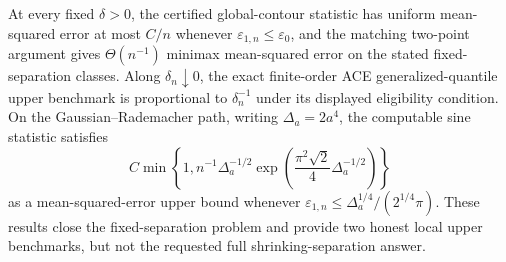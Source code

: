 At every fixed \(\delta>0\), the certified global-contour statistic has uniform mean-squared error at most \(C/n\) whenever \(\varepsilon_{1,n}\le\varepsilon_0\), and the matching two-point argument gives \(\Theta(n^{-1})\) minimax mean-squared error on the stated fixed-separation classes. Along \(\delta_n\downarrow0\), the exact finite-order ACE generalized-quantile upper benchmark is proportional to \(\delta_n^{-1}\) under its displayed eligibility condition. On the Gaussian--Rademacher path, writing \(\Delta_a=2a^4\), the computable sine statistic satisfies
\[
 C\min\!\left\{1,n^{-1}\Delta_a^{-1/2}
 \exp\!\left(\frac{\pi^2\sqrt2}{4}\Delta_a^{-1/2}\right)\right\}
\]
as a mean-squared-error upper bound whenever \(\varepsilon_{1,n}\le\Delta_a^{1/4}/(2^{1/4}\pi)\). These results close the fixed-separation problem and provide two honest local upper benchmarks, but not the requested full shrinking-separation answer.